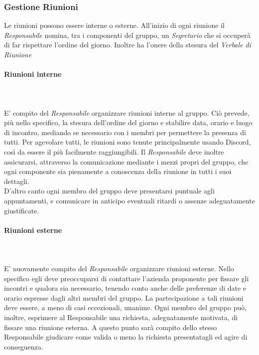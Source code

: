 \subsubsection{Gestione Riunioni}
Le riunioni possono essere interne o esterne. All'inizio di ogni riunione il \textit{Responsabile} nomina, tra i componenti del gruppo, un \textit{Segretario} che si occuperà di far rispettare l'ordine del giorno. Inoltre ha l'onere della stesura del \textit{Verbale di Riunione}\glo

\paragraph{Riunioni interne} \mbox{} \\ \mbox{} \\
E' compito del \textit{Responsabile} organizzare riunioni interne al gruppo. Ciò prevede, più nello specifico, la stesura dell'ordine del giorno e
stabilire data, orario e luogo di incontro, mediando se necessario con i membri per permettere la presenza di tutti. Per agevolare tutti, le riunioni sono tenute principalmente usando Discord, così da essere il più facilmente raggiungibili.
Il \textit{Responsabile} deve inoltre assicurarsi, attraverso la comunicazione
mediante i mezzi propri del gruppo, che ogni componente sia pienamente a conoscenza della riunione in tutti i suoi dettagli. \\
D'altro canto ogni membro del gruppo deve presentarsi puntuale agli appuntamenti,
e comunicare in anticipo eventuali ritardi o assenze adeguatamente giustificate.

\paragraph{Riunioni esterne} \mbox{} \\ \mbox{} \\
E' nuovamente compito del \textit{Responsabile} organizzare riunioni esterne.
Nello specifico egli deve preoccuparsi di contattare l'azienda proponente per fissare gli
incontri e qualora sia necessario, tenendo conto anche delle preferenze di date e orario
espresse dagli altri membri del gruppo. La partecipazione a tali riunioni deve essere,
a meno di casi eccezionali, unanime.
Ogni membro del gruppo può, inoltre, esprimere al Responsabile una richiesta, adeguatamente motivata, di fissare una riunione esterna. A questo punto sarà compito
dello stesso Responsabile giudicare come valida o meno la richiesta presentatagli ed
agire di conseguenza.

